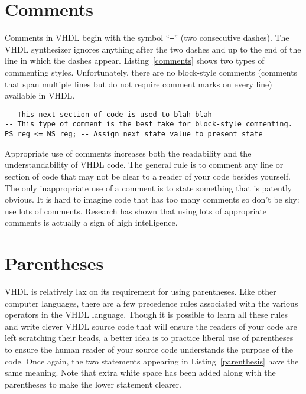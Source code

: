 \section{Comments}
Comments in VHDL begin with the symbol ``\texttt{--}'' (two consecutive dashes). The VHDL synthesizer ignores anything after the two dashes and up to the end of the line in which the dashes appear. Listing~\ref{comments} shows two types of commenting styles. Unfortunately, there are no block-style comments (comments that span multiple lines but do not require comment marks on every line) available in VHDL.

\noindent
\begin{minipage}{0.99\linewidth}
\begin{lstlisting}[label=comments, caption=Two typical uses of comments.]
-- This next section of code is used to blah-blah
-- This type of comment is the best fake for block-style commenting.
PS_reg <= NS_reg; -- Assign next_state value to present_state
\end{lstlisting}
\end{minipage}

Appropriate use of comments increases both the readability and the understandability of VHDL code. The general rule is to comment any line or section of code that may not be clear to a reader of your code besides yourself. The only inappropriate use of a comment is to state something that is patently obvious. It is hard to imagine code that has too many comments so don't be shy: use lots of comments. Research has shown that using lots of appropriate comments is actually a sign of high intelligence.

\section{Parentheses}
VHDL is relatively lax on its requirement for using parentheses. Like other computer languages, there are a few precedence rules associated with the various operators in the VHDL language. Though it is possible to learn all these rules and write clever VHDL source code that will ensure the readers of your code are left scratching their heads, a better idea is to practice liberal use of parentheses to ensure the human reader of your source code understands the purpose of the code. Once again, the two statements appearing in Listing~\ref{parenthesis} have the same meaning. Note that extra white space has been added along with the parentheses to make the lower statement clearer.

